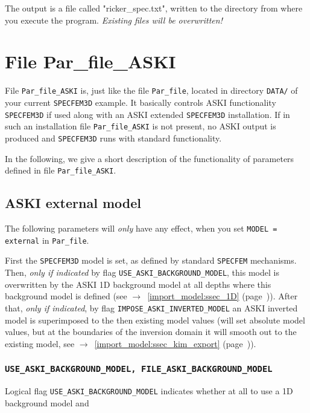 \documentclass[12pt,a4paper]{article}
\newcommand{\lcode}[1]{\nolinkurl{#1}}
\newcommand{\lcodetitle}[1]{ {\ttfamily #1} }
\newcommand{\ASKI}{ {\ttfamily ASKI} }
\newcommand{\myaref}[1]{$\rightarrow$~\ref{#1} (page~\pageref{#1})}
\begin{document}
The output is a file called "ricker\_spec.txt", written to the directory from where you execute the program. 
\emph{Existing files will be overwritten!}
%
\section{File \lcodetitle{Par\_file\_ASKI}} \label{file_Par_file_ASKI}
%
File \lcode{Par_file_ASKI} is, just like the file \lcode{Par_file}, located in directory 
\lcode{DATA/} of your current \lcode{SPECFEM3D} example. It basically controls \ASKI functionality 
\lcode{SPECFEM3D} if used along with an \ASKI extended \lcode{SPECFEM3D} installation. If in such an 
installation file \lcode{Par_file_ASKI} is not present, no \ASKI output is produced and 
\lcode{SPECFEM3D} runs with standard functionality. 

In the following, we give a short description of the functionality of parameters defined
in file \lcode{Par_file_ASKI}.
\subsection{\lcodetitle{ASKI} external model} \label{Par_file_ASKI,sub:ext_model}
The following parameters will \emph{only} have any effect, when you set \lcode{MODEL = external}
in \lcode{Par_file}. %

First the \lcode{SPECFEM3D} model is set, as defined by standard \lcode{SPECFEM} mechanisms. 
Then, \emph{only if indicated} by flag \lcode{USE_ASKI_BACKGROUND_MODEL}, this model is overwritten 
by the \ASKI 1D background model at all depths where this background model is defined (see
\myaref{import_model:ssec_1D}).
After that, \emph{only if indicated}, by flag \lcode{IMPOSE_ASKI_INVERTED_MODEL} an \ASKI inverted 
model is superimposed to the then existing model values (will set absolute model values, 
but at the boundaries of the inversion domain it will smooth out to the existing model, see
\myaref{import_model:ssec_kim_export}).

\subsubsection*{\lcode{USE_ASKI_BACKGROUND_MODEL, FILE_ASKI_BACKGROUND_MODEL}}
Logical flag \lcode{USE_ASKI_BACKGROUND_MODEL} indicates whether at all to use a 1D background model and
\end{document}

